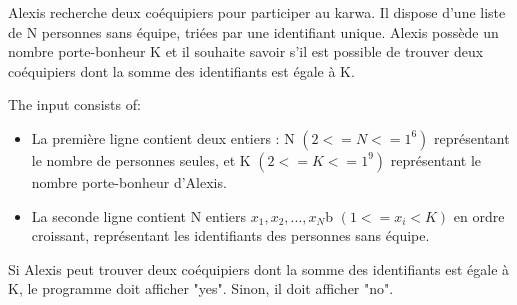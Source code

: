 \problemname{\problemyamlname}


\newcommand{\maxa}{123456789}

Alexis recherche deux coéquipiers pour participer au karwa. Il dispose d'une liste de N personnes sans équipe, triées par une identifiant unique. 
Alexis possède un nombre porte-bonheur K et il souhaite savoir s'il est possible de trouver deux coéquipiers dont la somme des identifiants est égale à K.


\begin{Input}
    The input consists of:
    \begin{itemize}
        \item La première ligne contient deux entiers : N $(2 <= N <= 1^6)$ représentant le nombre de personnes seules, et K $(2 <= K <= 1^9)$ représentant le nombre porte-bonheur d'Alexis.

        \item La seconde ligne contient N entiers $x_1, x_2, ..., x_N$b $(1 <= x_i < K)$ en ordre croissant, représentant les identifiants des personnes sans équipe.
        
    \end{itemize}
\end{Input}

\begin{Output}
    Si Alexis peut trouver deux coéquipiers dont la somme des identifiants est égale à K, le programme doit afficher "yes". Sinon, il doit afficher "no".
\end{Output}
